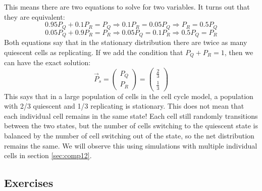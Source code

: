\documentclass[
  letterpaper,
  DIV=11,
  numbers=noendperiod]{scrreprt}
\begin{document}
This means there are two equations to solve for two variables. It turns
out that they are equivalent:
\[ 0.95P_Q + 0.1P_R = P_Q \Rightarrow 0.1P_R = 0.05P_Q \Rightarrow P_R = 0.5P_Q\]
\[ 0.05P_Q + 0.9P_R  = P_R \Rightarrow 0.05P_Q  = 0.1P_R  \Rightarrow  0.5P_Q =  P_R  \]
Both equations say that in the stationary distribution there are twice
as many quiescent cells as replicating. If we add the condition that
\(P_Q+P_R = 1\), then we can have the exact solution:
\[\vec P_s =  \left(\begin{array}{c} P_Q  \\ P_R \end{array} \right)  =  \left(\begin{array}{c} \frac{2}{3}  \\ \frac{1}{3} \end{array} \right) \]
This says that in a large population of cells in the cell cycle model, a
population with 2/3 quiescent and 1/3 replicating is stationary. This
does not mean that each individual cell remains in the same state! Each
cell still randomly transitions between the two states, but the number
of cells switching to the quiescent state is balanced by the number of
cell switching out of the state, so the net distribution remains the
same. We will observe this using simulations with multiple individual
cells in section \ref{sec:comp12}.

\hypertarget{exercises-37}{%
\subsection{Exercises}\label{exercises-37}}
\end{document}
